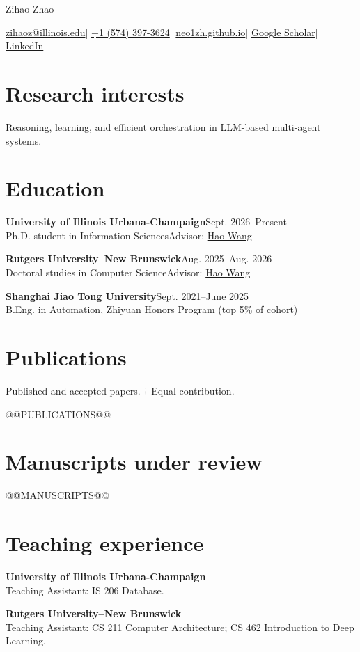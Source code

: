 \documentclass[11pt,letterpaper]{article}
\newcommand{\education}[4]{\needspace{3\baselineskip}\textbf{#1}\hfill {\small #2}\\#3{\small\color{secondary}\quad #4}\par\vspace{6pt}}
\begin{document}
{\fontsize{29}{33}\selectfont Zihao Zhao}\par
\vspace{5pt}
{\sffamily\small\href{mailto:zihaoz@illinois.edu}{zihaoz@illinois.edu}\enspace | \enspace\href{tel:+15743973624}{+1 (574) 397-3624}\enspace | \enspace\href{https://neo1zh.github.io}{neo1zh.github.io}\enspace | \enspace\href{https://scholar.google.com/citations?hl=en&user=lYnRuzkAAAAJ&view_op=list_works&sortby=pubdate}{Google Scholar}\enspace | \enspace\href{https://www.linkedin.com/in/zihao-neo-zhao/}{LinkedIn}}\par
\section{Research interests}
Reasoning, learning, and efficient orchestration in LLM-based multi-agent systems.
\section{Education}
\education{University of Illinois Urbana-Champaign}{Sept. 2026--Present}{Ph.D. student in Information Sciences}{Advisor: \href{http://www.wanghao.in}{Hao Wang}}
\education{Rutgers University--New Brunswick}{Aug. 2025--Aug. 2026}{Doctoral studies in Computer Science}{Advisor: \href{http://www.wanghao.in}{Hao Wang}}
\education{Shanghai Jiao Tong University}{Sept. 2021--June 2025}{B.Eng. in Automation, Zhiyuan Honors Program (top 5\% of cohort)}{}
\section{Publications}
{\small\color{secondary}Published and accepted papers. $\dagger$ Equal contribution.}\par
\begin{enumerate}
@@PUBLICATIONS@@
\end{enumerate}
\section{Manuscripts under review}
\begin{enumerate}[resume]
@@MANUSCRIPTS@@
\end{enumerate}
\section{Teaching experience}
\textbf{University of Illinois Urbana-Champaign}\\
Teaching Assistant: IS 206 Database.\par\vspace{4pt}
\textbf{Rutgers University--New Brunswick}\\
Teaching Assistant: CS 211 Computer Architecture; CS 462 Introduction to Deep Learning.
\end{document}
